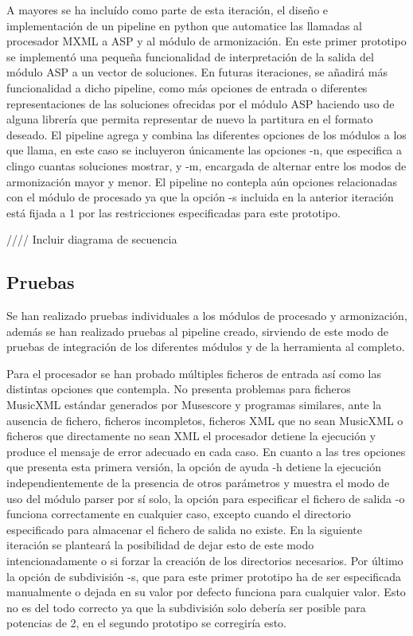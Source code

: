 A mayores se ha incluído como parte de esta iteración, el diseño e implementación de un pipeline en python que automatice las llamadas al procesador MXML a ASP y al módulo de armonización. En este primer prototipo se implementó una pequeña funcionalidad de interpretación de la salida del módulo ASP a un vector de soluciones. En futuras iteraciones, se añadirá más funcionalidad a dicho pipeline, como más opciones de entrada o diferentes representaciones de las soluciones ofrecidas por el módulo ASP haciendo uso de alguna librería que permita representar de nuevo la partitura en el formato deseado. El pipeline agrega y combina las diferentes opciones de los módulos a los que llama, en este caso se incluyeron únicamente las opciones -n, que especifica a clingo cuantas soluciones mostrar, y -m, encargada de alternar entre los modos de armonización mayor y menor. El pipeline no contepla aún opciones relacionadas con el módulo de procesado ya que la opción -s incluida en la anterior iteración está fijada a 1 por las restricciones especificadas para este prototipo. 

//// Incluir diagrama de secuencia

\subsection{Pruebas}
Se han realizado pruebas individuales a los módulos de procesado y armonización, además se han realizado pruebas al pipeline creado, sirviendo de este modo de pruebas de integración de los diferentes módulos y de la herramienta al completo.

Para el procesador se han probado múltiples ficheros de entrada así como las distintas opciones que contempla. No presenta problemas para ficheros MusicXML estándar generados por Musescore y programas similares, ante la ausencia de fichero, ficheros incompletos, ficheros XML que no sean MusicXML o ficheros que directamente no sean XML el procesador detiene la ejecución y produce el mensaje de error adecuado en cada caso. En cuanto a las tres opciones que presenta esta primera versión, la opción de ayuda -h detiene la ejecución independientemente de la presencia de otros parámetros y muestra el modo de uso del módulo parser por sí solo, la opción para especificar el fichero de salida -o funciona correctamente en cualquier caso, excepto cuando el directorio especificado para almacenar el fichero de salida no existe. En la siguiente iteración se planteará la posibilidad de dejar esto de este modo intencionadamente o si forzar la creación de los directorios necesarios. Por último la opción de subdivisión -s, que para este primer prototipo ha de ser especificada manualmente o dejada en su valor por defecto funciona para cualquier valor. Esto no es del todo correcto ya que la subdivisión solo debería ser posible para potencias de 2, en el segundo prototipo se corregiría esto.

